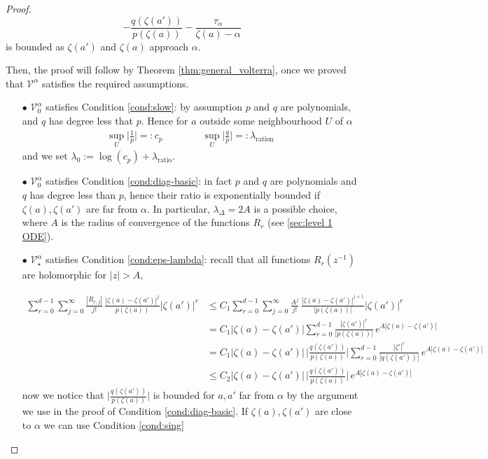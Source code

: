 \documentclass{article}
\theoremstyle{plain}
\newcommand{\volterra}{\mathcal{V}}
\newcommand{\hardpart}{\mathcal{V}_0}
\newcommand{\softpart}{\mathcal{V}_\star}
\begin{document}
\begin{proof}
\begin{equation*}
    -\frac{q(\zeta(a'))}{p(\zeta(a))}-\frac{\tau_\alpha}{\zeta(a)-\alpha}
\end{equation*}
is bounded as $\zeta(a')$ and $\zeta(a)$ approach $\alpha$. 

Then, the proof will follow by Theorem \ref{thm:general_volterra}, once we proved that $\volterra^\alpha$ satisfies the required assumptions.  

\begin{enumerate}
    \item[$\bullet$] $\hardpart^\alpha$ satisfies Condition \eqref{cond:slow}: by assumption $p$ and $q$ are polynomials, and $q$ has degree less that $p$. Hence for $a$ outside some neighbourhood $U$ of $\alpha$  
\begin{align*}
    \sup_U \Big\vert \frac{1}{p}\Big\vert =:c_p \qquad\qquad \sup_U \Big\vert\frac{q}{p}\Big\vert =:\lambda_\text{ration} 
\end{align*}
    and we set $\lambda_0:=\log(c_p)+\lambda_\text{ratio}$. 
    \item[$\bullet$] $\hardpart^\alpha$ satisfies Condition \eqref{cond:diag-basic}: in fact $p$ and $q$ are polynomials and $q$ has degree less than $p$, hence their ratio is exponentially bounded if $\zeta(a), \zeta(a')$ are far from $\alpha$. In particular, $\lambda_\Delta=2A$ is a possible choice, where $A$ is the radius of convergence of the functions $R_r$ (see \ref{sec:level 1 ODE}).    
    \item[$\bullet$]  $\softpart^\alpha$ satisfies Condition \eqref{cond:eps-lambda}: recall that all functions $R_r(z^{-1})$ are holomorphic for $|z|>A$, 

    \begin{align*}
        \sum_{r=0}^{d-1}\sum_{j=0}^\infty \frac{| R_{r,j}|}{j!} \, \frac{|\zeta(a)-\zeta(a')|^j}{p(\zeta(a))}|\zeta(a')|^r  &\leq C_1 \sum_{r=0}^{d-1}\sum_{j=0}^\infty \frac{A^j}{j!} \, \frac{|\zeta(a)-\zeta(a')|^{j+1}}{|p(\zeta(a))|}|\zeta(a')|^r \\
        & =C_1 |\zeta(a)-\zeta(a')| \sum_{r=0}^{d-1} \frac{|\zeta(a')|^r}{|p(\zeta(a))|}\,  e^{A |\zeta(a)-\zeta(a')|}\\
        &=C_1 |\zeta(a)-\zeta(a')| \, \Big\vert \frac{q(\zeta(a'))}{p(\zeta(a))}\Big\vert \sum_{r=0}^{d-1} \frac{|\zeta'|^r}{|q(\zeta(a'))|} \, e^{A |\zeta(a)-\zeta(a')|}\\
        &\leq C_2 |\zeta(a)-\zeta(a')| \, \Big\vert \frac{q(\zeta(a'))}{p(\zeta(a))}\Big\vert \,  e^{A |\zeta(a)-\zeta(a')|}
    \end{align*}
now we notice that $\Big\vert \frac{q(\zeta(a'))}{p(\zeta(a))}\Big\vert$ is bounded for $a,a'$ far from $\alpha$ by the argument we use in the proof of Condition \eqref{cond:diag-basic}. If $\zeta(a), \zeta(a')$ are close to $\alpha$ we can use Condition \eqref{cond:sing}


\end{enumerate}
\end{proof}
\end{document}
